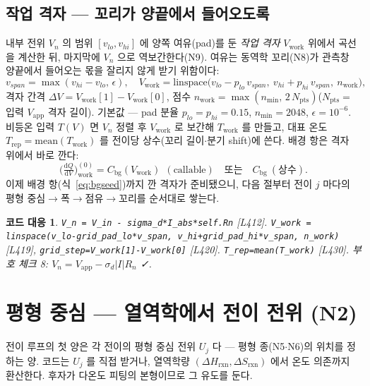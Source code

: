 \documentclass[11pt,a4paper]{article}
\newtheorem*{codebox}{코드 대응}
\newcommand{\dd}{\mathrm{d}}
\newcommand{\app}{\mathrm{app}}
\newcommand{\bg}{\mathrm{bg}}
\newcommand{\work}{\mathrm{work}}
\newcommand{\rep}{\mathrm{rep}}
\newcommand{\sgn}{\sigma_d}
\begin{document}
\subsection{작업 격자 — 꼬리가 양끝에서 들어오도록}
내부 전위 $V_n$ 의 범위 $[v_{lo},v_{hi}]$ 에 양쪽 여유(pad)를 둔 \emph{작업 격자} $V_\work$ 위에서 곡선을 계산한 뒤, 마지막에 $V_n$ 으로 역보간한다(N9). 여유는 동역학 꼬리(N8)가 관측창 양끝에서 들어오는 몫을 잘리지 않게 받기 위함이다:
\begin{equation}
v_{span}=\max(v_{hi}-v_{lo},\,\epsilon),\quad
V_\work=\mathrm{linspace}\!\big(v_{lo}-p_{lo}\,v_{span},\ v_{hi}+p_{hi}\,v_{span},\ n_\work\big),
\label{eq:vwork}
\end{equation}
격자 간격 $\Delta V=V_\work[1]-V_\work[0]$, 점수 $n_\work=\max(n_{\min},\,2\,N_{\mathrm{pts}})$($N_{\mathrm{pts}}=$ 입력 $V_\app$ 격자 길이). 기본값 — pad 분율 $p_{lo}=p_{hi}=0.15$, $n_{\min}=2048$, $\epsilon=10^{-6}$. 비등온 입력 $T(V)$ 면 $V_n$ 정렬 후 $V_\work$ 로 보간해 $T_\work$ 를 만들고, 대표 온도 $T_\rep=\mathrm{mean}(T_\work)$ 를 전이당 상수(꼬리 길이$\cdot$분기 shift)에 쓴다. 배경 항은 격자 위에서 바로 깐다:
\begin{equation}
\Big(\tfrac{\dd Q}{\dd V}\Big)_\work^{(0)}=C_\bg(V_\work)\ \ (\text{callable})\quad\text{또는}\quad C_\bg\ (\text{상수}).
\label{eq:bgseed}
\end{equation}
이제 배경 항(식~\eqref{eq:bgseed})까지 깐 격자가 준비됐으니, 다음 절부터 전이 $j$ 마다의 평형 중심$\to$폭$\to$점유$\to$꼬리를 순서대로 쌓는다.

\begin{codebox}
\texttt{V\_n = V\_in - sigma\_d*I\_abs*self.Rn} [L412]. \texttt{V\_work = linspace(v\_lo-grid\_pad\_lo*v\_span, v\_hi+grid\_pad\_hi*v\_span, n\_work)} [L419], \texttt{grid\_step=V\_work[1]-V\_work[0]} [L420]. \texttt{T\_rep=mean(T\_work)} [L430]. 부호 체크 8: $V_n=V_\app-\sgn|I|R_n$ ✓.
\end{codebox}

\section{평형 중심 — 열역학에서 전이 전위 (N2)}\label{sec:Uj}
전이 루프의 첫 양은 각 전이의 평형 중심 전위 $U_j$ 다 — 평형 종(N5$\cdot$N6)의 위치를 정하는 양. 코드는 $U_j$ 를 직접 받거나, 열역학량 $(\Delta H_{\mathrm{rxn}},\Delta S_{\mathrm{rxn}})$ 에서 온도 의존까지 환산한다. 후자가 다온도 피팅의 본형이므로 그 유도를 둔다.
\end{document}
